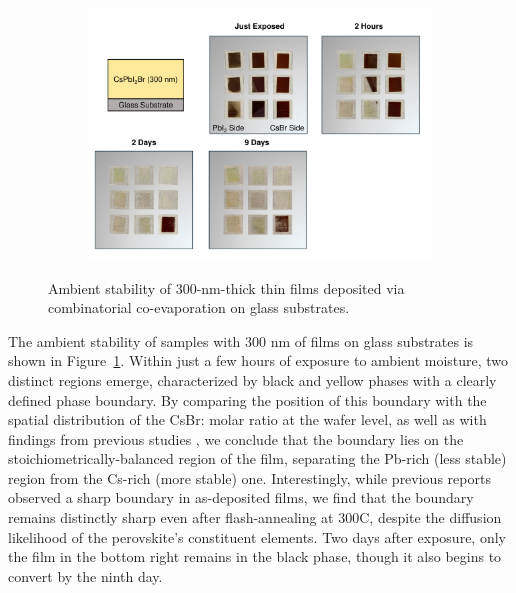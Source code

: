\begin{figure}[htbp]
    \centering
    \begin{subfigure}[t]{0.99\textwidth}
        \centering
        \includegraphics[width=\textwidth]{chapters/stability/imeges/Stability - No Rotation_275nm_on_glass.pdf} %
               
    \end{subfigure}

    \caption[Ambient stability of 300-nm-thick  thin films deposited via combinatorial co-evaporation on glass substrates.]{Ambient stability of 300-nm-thick  thin films deposited via combinatorial co-evaporation on glass substrates.}
    \label{fig:stability:no_rotation:300nm_glass}
\end{figure}


The ambient stability of samples with 300 nm of  films on glass substrates is shown in Figure~\ref{fig:stability:no_rotation:300nm_glass}. Within just a few hours of exposure to ambient moisture, two distinct regions emerge, characterized by black and yellow phases with a clearly defined phase boundary. By comparing the position of this boundary with the spatial distribution of the CsBr: molar ratio at the wafer level, as well as with findings from previous studies \cite{Becker2019LowExperimentation, Lin2024FormationTreatment}, we conclude that the boundary lies on the stoichiometrically-balanced region of the film, separating the Pb-rich (less stable) region from the Cs-rich (more stable) one. Interestingly, while previous reports observed a sharp boundary in as-deposited films, we find that the boundary remains distinctly sharp even after flash-annealing at 300\degree C, despite the diffusion likelihood of the perovskite's constituent elements. Two days after exposure, only the film in the bottom right remains in the black phase, though it also begins to convert by the ninth day.


